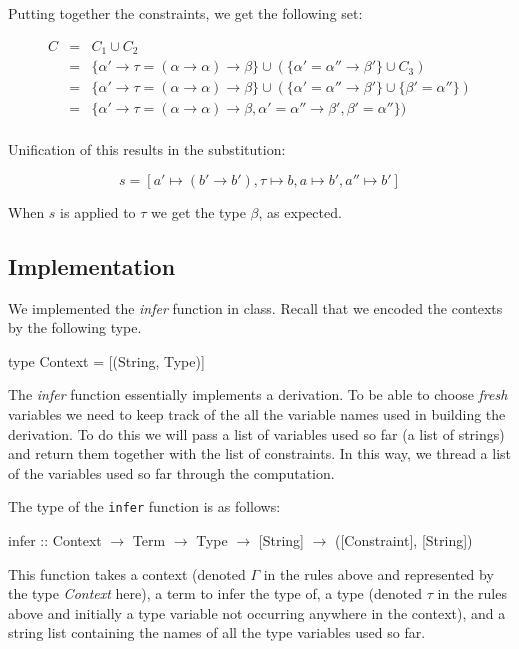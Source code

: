 \documentclass[11pt]{article}
\begin{document}
\begin{example}
Putting together the constraints, we get the following set:

\[\begin{array}{lcl}
C & = & C_1 \cup C_2 \\
  & = & \{\alpha'\rightarrow\tau=(\alpha\rightarrow\alpha)\rightarrow\beta\} \cup (\{\alpha'=\alpha'' \rightarrow \beta'\}\cup{}C_3)\\
  & = & \{\alpha'\rightarrow\tau=(\alpha\rightarrow\alpha)\rightarrow\beta\} \cup (\{\alpha'=\alpha'' \rightarrow \beta'\}\cup{}\{\beta'=\alpha''\})\\
  & = & \{\alpha'\rightarrow\tau=(\alpha\rightarrow\alpha)\rightarrow\beta,\alpha'=\alpha'' \rightarrow \beta', \beta'=\alpha''\})\\
\end{array}\]

Unification of this results in the substitution:

\[s = [a' \mapsto (b' \rightarrow b'),\tau \mapsto b,a \mapsto b',a'' \mapsto b']\]

When $s$ is applied to $\tau$ we get the type $\beta$, as expected.

\end{example}



\subsection{Implementation}


We implemented the {\it{infer}} function in class.  Recall that we encoded
the contexts  by the following type.
\begin{program**}
\> type Context = [(String, Type)]\\
\end{program**}

The {\it{infer}} function essentially implements a derivation.  To be able to
choose {\em{fresh}} variables we need to keep track of the all the variable
names used in building the derivation.  To do this we will pass a list of
variables used so far (a list of strings) and return them together with the
list of constraints.  In this way, we thread a list of the variables used so
far through the computation.


The type of the {\tt{infer}} function is as follows:
\begin{program**}
\> infer :: Context $\rightarrow$ Term $\rightarrow$ Type $\rightarrow$ [String] $\rightarrow$ ([Constraint], [String]) \\ 
\end{program**}
This function takes a context (denoted $\Gamma$ in the rules above and
represented by the type {\it{Context}} here), a term to infer the type of, a
type (denoted $\tau$ in the rules above and initially a type variable not
occurring anywhere in the context), and a string list containing the names of
all the type variables used so far.
\end{document}
